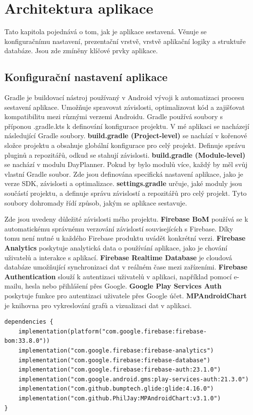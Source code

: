\chapter{Architektura aplikace}
\hspace{14pt} Tato kapitola pojednává o tom, jak je aplikace sestavená. Věnuje se konfiguračnímu nastavení, prezentační vrstvě, vrstvě aplikační logiky a struktuře databáze. Jsou zde zmíněny klíčové prvky aplikace.
\section{Konfigurační nastavení aplikace}
\hspace{14pt} Gradle je buildovací nástroj používaný v Android vývoji k automatizaci procesu sestavení aplikace. Umožňuje spravovat závislosti, optimalizovat kód a zajišťovat kompatibilitu mezi různými verzemi Androidu. Gradle používá soubory s příponou .gradle.kts k definování konfigurace projektu. V mé aplikaci se nacházejí následující Gradle soubory. \textbf{build.gradle (Project-level)} se nachází v kořenové složce projektu a obsahuje globální konfigurace pro celý projekt. Definuje správu pluginů a repozitářů, odkud se stahují závislosti. \textbf{build.gradle (Module-level)} se nachází v modulu DayPlanner. Pokud by bylo modulů více, každý by měl svůj vlastní Gradle soubor. Zde jsou definována specifická nastavení aplikace, jako je verze SDK, závislosti a optimalizace. \textbf{settings.gradle} určuje, jaké moduly jsou součástí projektu, a definuje správu závislostí a repozitářů pro celý projekt. Tyto soubory dohromady řídí způsob, jakým se aplikace sestavuje.

\newpage

Zde jsou uvedeny důležité závislosti mého projektu. \textbf{Firebase BoM} používá se k automatickému správnému verzování závislostí souvisejících s Firebase. Díky tomu není nutné u každého Firebase produktu uvádět konkrétní verzi. \textbf{Firebase Analytics} poskytuje analytická data o používání aplikace, jako je chování uživatelů a interakce s aplikací.\textbf{ Firebase Realtime Database} je cloudová databáze umožňující synchronizaci dat v reálném čase mezi zařízeními. \textbf{Firebase Authentication} slouží k autentizaci uživatelů v aplikaci, například pomocí e-mailu, hesla nebo přihlášení přes Google. \textbf{Google Play Services Auth} poskytuje funkce pro autentizaci uživatele přes Google účet. \textbf{MPAndroidChart} je knihovna pro vykreslování grafů a vizualizaci dat v aplikaci.
\begin{lstlisting}[style=javastyle,caption = {build.gradle},label = {lst:build.gradle}]
dependencies {
    implementation(platform("com.google.firebase:firebase-bom:33.8.0"))
    implementation("com.google.firebase:firebase-analytics")
    implementation("com.google.firebase:firebase-database")
    implementation("com.google.firebase:firebase-auth:23.1.0")
    implementation("com.google.android.gms:play-services-auth:21.3.0")
    implementation("com.github.bumptech.glide:glide:4.16.0")
    implementation("com.github.PhilJay:MPAndroidChart:v3.1.0")
}
\end{lstlisting}

